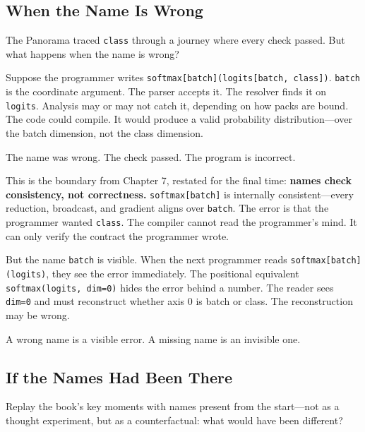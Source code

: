 \documentclass[11pt,titlepage]{article}
\begin{document}
\vspace{2em}

\hypertarget{when-the-name-is-wrong}{%
\subsection{When the Name Is Wrong}\label{when-the-name-is-wrong}}

The Panorama traced \texttt{class} through a journey where every check
passed. But what happens when the name is wrong?

Suppose the programmer writes
\texttt{softmax{[}batch{]}(logits{[}batch,\ class{]})}. \texttt{batch}
is the coordinate argument. The parser accepts it. The resolver finds it
on \texttt{logits}. Analysis may or may not catch it, depending on how
packs are bound. The code could compile. It would produce a valid
probability distribution---over the batch dimension, not the class
dimension.

The name was wrong. The check passed. The program is incorrect.

This is the boundary from Chapter 7, restated for the final time:
\textbf{names check consistency, not correctness.}
\texttt{softmax{[}batch{]}} is internally consistent---every reduction,
broadcast, and gradient aligns over \texttt{batch}. The error is that
the programmer wanted \texttt{class}. The compiler cannot read the
programmer's mind. It can only verify the contract the programmer wrote.

But the name \texttt{batch} is visible. When the next programmer reads
\texttt{softmax{[}batch{]}(logits)}, they see the error immediately. The
positional equivalent \texttt{softmax(logits,\ dim=0)} hides the error
behind a number. The reader sees \texttt{dim=0} and must reconstruct
whether axis 0 is batch or class. The reconstruction may be wrong.

A wrong name is a visible error. A missing name is an invisible one.

\vspace{2em}

\hypertarget{if-the-names-had-been-there}{%
\subsection{If the Names Had Been
There}\label{if-the-names-had-been-there}}

Replay the book's key moments with names present from the start---not as
a thought experiment, but as a counterfactual: what would have been
different?
\end{document}
